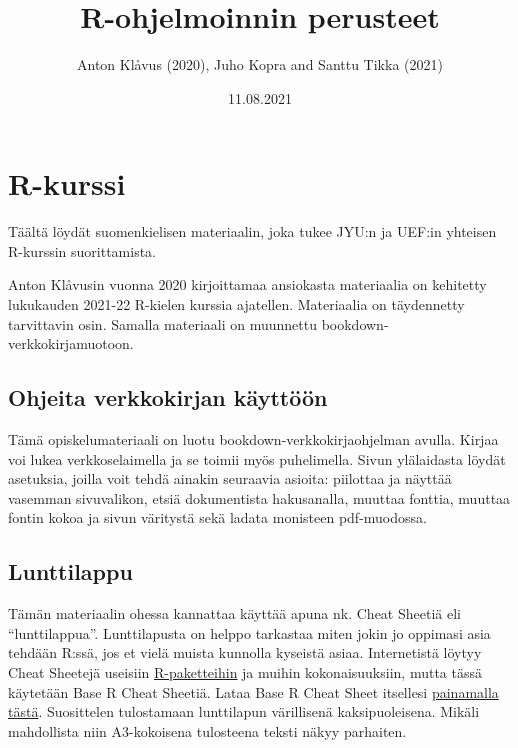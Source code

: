 \documentclass[
]{book}
\title{R-ohjelmoinnin perusteet}
\author{Anton Klåvus (2020), Juho Kopra and Santtu Tikka (2021)}
\date{11.08.2021}
\begin{document}
\maketitle

{
\setcounter{tocdepth}{1}
\tableofcontents
}
\hypertarget{r-kurssi}{%
\chapter*{R-kurssi}\label{r-kurssi}}

Täältä löydät suomenkielisen materiaalin, joka tukee JYU:n ja UEF:in yhteisen R-kurssin suorittamista.

Anton Klåvusin vuonna 2020 kirjoittamaa ansiokasta materiaalia on kehitetty lukukauden 2021-22 R-kielen kurssia ajatellen. Materiaalia on täydennetty tarvittavin osin. Samalla materiaali on muunnettu bookdown-verkkokirjamuotoon.

\hypertarget{ohjeita-verkkokirjan-kuxe4yttuxf6uxf6n}{%
\section*{Ohjeita verkkokirjan käyttöön}\label{ohjeita-verkkokirjan-kuxe4yttuxf6uxf6n}}

Tämä opiskelumateriaali on luotu bookdown-verkkokirjaohjelman avulla. Kirjaa voi lukea verkkoselaimella ja se toimii myös puhelimella. Sivun ylälaidasta löydät asetuksia, joilla voit tehdä ainakin seuraavia asioita: piilottaa ja näyttää vasemman sivuvalikon, etsiä dokumentista hakusanalla, muuttaa fonttia, muuttaa fontin kokoa ja sivun väritystä sekä ladata monisteen pdf-muodossa.

\hypertarget{lunttilappu}{%
\section*{Lunttilappu}\label{lunttilappu}}

Tämän materiaalin ohessa kannattaa käyttää apuna nk. Cheat Sheetiä eli ``lunttilappua''. Lunttilapusta on helppo tarkastaa miten jokin jo oppimasi asia tehdään R:ssä, jos et vielä muista kunnolla kyseistä asiaa. Internetistä löytyy Cheat Sheetejä useisiin \href{https://www.rstudio.com/resources/cheatsheets/}{R-paketteihin} ja muihin kokonaisuuksiin, mutta tässä käytetään Base R Cheat Sheetiä. Lataa Base R Cheat Sheet itsellesi \href{files/base_R_cheat_sheet.pdf}{painamalla tästä}. Suosittelen tulostamaan lunttilapun värillisenä kaksipuoleisena. Mikäli mahdollista niin A3-kokoisena tulosteena teksti näkyy parhaiten.
\end{document}
